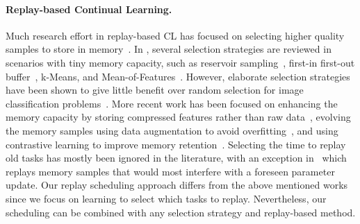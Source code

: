 \paragraph{Replay-based Continual Learning.} 
Much research effort in replay-based CL has focused on selecting higher quality samples to store in memory~\cite{aljundi2019gradient, borsos2020coresets, chaudhry2019tiny, hayes2019memory, isele2018selective, nguyen2017variational, rebuffi2017icarl, yoon2021online}. %
In \cite{chaudhry2019tiny}, several selection strategies are reviewed in scenarios with tiny memory capacity, such as reservoir sampling~\cite{vitter1985random}, first-in first-out buffer~\cite{lopez2017gradient}, k-Means, and Mean-of-Features~\cite{rebuffi2017icarl}. However, elaborate selection strategies have been shown to give little benefit over random selection for image classification problems~\cite{chaudhry2018riemannian, hayes2020remind}. 
More recent work has been focused on enhancing the memory capacity by storing compressed features rather than raw data~\cite{hayes2020remind, pellegrini2019latent}, evolving the memory samples using data augmentation to avoid overfitting~\cite{jin2020gradient,bang2021rainbow}, and using contrastive learning to improve memory retention~\cite{cha2021co2l,mai2021supervised}. 
Selecting the time to replay old tasks has mostly been ignored in the literature, with an exception in~\cite{aljundi2019online} which replays memory samples that would most interfere with a foreseen parameter update. Our replay scheduling approach differs from the above mentioned works since we focus on learning to select which tasks to replay. Nevertheless, our scheduling can be combined with any selection strategy and replay-based method.


